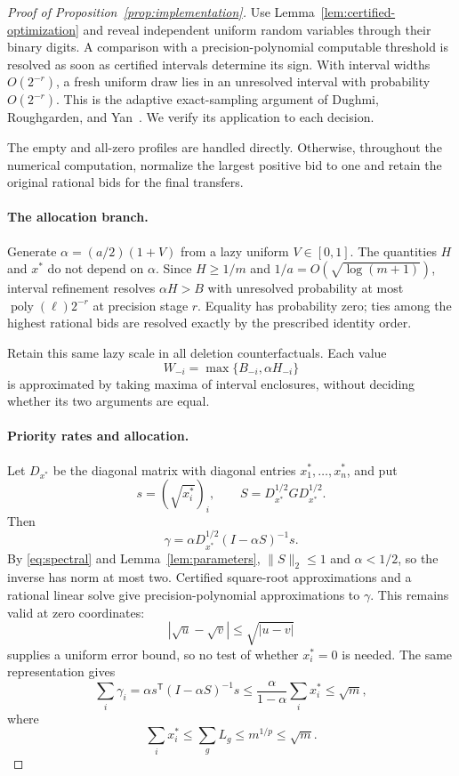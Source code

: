 \documentclass[11pt]{article}
\begin{document}
\begin{proof}[Proof of Proposition~\ref{prop:implementation}]
Use Lemma~\ref{lem:certified-optimization} and reveal independent
uniform random variables through their binary digits.
A comparison with a precision-polynomial computable threshold
is resolved as soon as certified intervals determine its sign.
With interval widths $O(2^{-r})$, a fresh uniform draw lies in
an unresolved interval with probability $O(2^{-r})$.
This is the adaptive exact-sampling argument of Dughmi,
Roughgarden, and Yan~\cite[Appendix~B]{compDRY2011}.
We verify its application to each decision.

The empty and all-zero profiles are handled directly.
Otherwise, throughout the numerical computation, normalize
the largest positive bid to one and retain the original
rational bids for the final transfers.

\paragraph{The allocation branch.}
Generate $\alpha=(a/2)(1+V)$ from a lazy uniform
$V\in[0,1]$.
The quantities $H$ and $x^*$ do not depend on $\alpha$.
Since $H\ge1/m$ and $1/a=O(\sqrt{\log(m+1)})$,
interval refinement resolves $\alpha H>B$ with unresolved
probability at most
$\operatorname{poly}(\ell)2^{-r}$
at precision stage $r$.
Equality has probability zero; ties among the highest rational
bids are resolved exactly by the prescribed identity order.

Retain this same lazy scale in all deletion counterfactuals.
Each value
\[
W_{-i}=\max\{B_{-i},\alpha H_{-i}\}
\]
is approximated by taking maxima of interval enclosures,
without deciding whether its two arguments are equal.

\paragraph{Priority rates and allocation.}
Let $D_{x^*}$ be the diagonal matrix with diagonal entries
$x_1^*,\ldots,x_n^*$, and put
\[
s=(\sqrt{x_i^*})_i,
\qquad
S=D_{x^*}^{1/2}GD_{x^*}^{1/2}.
\]
Then
\[
\gamma
=
\alpha D_{x^*}^{1/2}(I-\alpha S)^{-1}s.
\]
By \eqref{eq:spectral} and Lemma~\ref{lem:parameters},
$\|S\|_2\le1$ and $\alpha<1/2$, so the inverse has norm
at most two.
Certified square-root approximations and a rational linear
solve give precision-polynomial approximations to $\gamma$.
This remains valid at zero coordinates:
\[
|\sqrt u-\sqrt v|\le\sqrt{|u-v|}
\]
supplies a uniform error bound, so no test of whether
$x_i^*=0$ is needed.
The same representation gives
\[
\sum_i\gamma_i
=
\alpha s^{\mathsf T}(I-\alpha S)^{-1}s
\le
\frac{\alpha}{1-\alpha}\sum_i x_i^*
\le\sqrt m,
\]
where
\[
\sum_i x_i^*
\le\sum_gL_g
\le m^{1/p}
\le\sqrt m.
\]


\end{proof}
\end{document}
